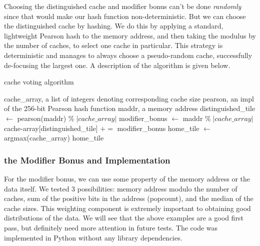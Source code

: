 Choosing the distinguished cache and modifier bonus can't be done
\textit{randomly} since that would make our hash function non-deterministic. But
we can choose the distinguished cache by hashing. We do this by applying a
standard, lightweight Pearson hash to the memory address, and then taking the
modulus by the number of caches, to select one cache in particular. This
strategy is deterministic and manages to always choose a pseudo-random cache,
successfully de-focusing the largest one.  A description of the algorithm is
given below.

\begin{algorithm}
  \caption{cache voting algorithm}
  \begin{algorithmic}[1]
    \REQUIRE cache\_array, a list of integers denoting corresponding cache size
    \REQUIRE pearson, an impl of the 256-bit Pearson hash function
    \REQUIRE maddr, a memory address
    \STATE distinguished\_tile $\leftarrow$ pearson(maddr) $ \% \; |cache\_array| $
    \STATE modifier\_bonus $\leftarrow$ maddr $ \% \; |cache\_array|$
    \STATE cache-array[distinguished\_tile] $+=$ modifier\_bonus
    \STATE home\_tile $\leftarrow$ argmax(cache\_array)
    \RETURN home\_tile
  \end{algorithmic}
\end{algorithm}

\subsubsection{the Modifier Bonus and Implementation }

For the modifier bonus, we can use some property of the memory address or the
data itself. We tested 3 possibilities: memory address modulo the number of
caches, sum of the positive bits in the address (popcount), and the median of
the cache sizes. This weighting component is extremely important to obtaining
good distributions of the data. We will see that the above examples are a good
first pass, but definitely need more attention in future tests.  The code was
implemented in Python without any library dependencies.

